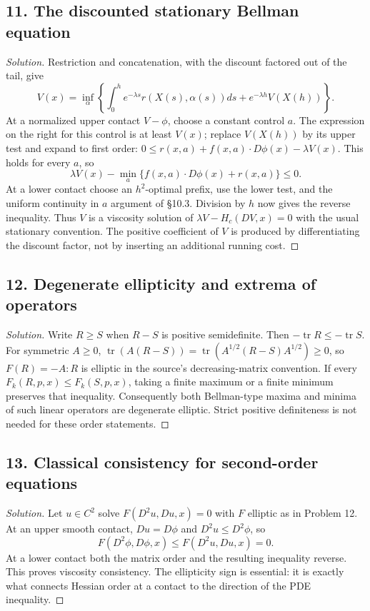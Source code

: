 \subsection*{11. The discounted stationary Bellman equation}
\begin{proof}[Solution]
Restriction and concatenation, with the discount factored out of the
tail, give
\[
 V(x)=\inf_\alpha\left\{\int_0^h e^{-\lambda s}r(X(s),\alpha(s))ds
                  +e^{-\lambda h}V(X(h))\right\}.
\]
At a normalized upper contact $V-\phi$, choose a constant control $a$.
The expression on the right for this control is at least $V(x)$;
replace $V(X(h))$ by its upper test and expand to first order:
$0\leq r(x,a)+f(x,a)\cdot D\phi(x)-\lambda V(x)$.
This holds for every $a$, so
\[
 \lambda V(x)-\min_a\{f(x,a)\cdot D\phi(x)+r(x,a)\}\leq0.
\]
At a lower contact choose an $h^2$-optimal prefix, use the lower test,
and the uniform continuity in $a$ argument of \S10.3. Division by $h$
now gives the reverse inequality. Thus $V$ is a viscosity solution of
$\lambda V-H_c(DV,x)=0$ with the usual stationary convention.
The positive coefficient of $V$ is produced by differentiating the
discount factor, not by inserting an additional running cost.
\end{proof}

\subsection*{12. Degenerate ellipticity and extrema of operators}
\begin{proof}[Solution]
Write $R\geq S$ when $R-S$ is positive semidefinite.
Then $-\operatorname{tr}R\leq-\operatorname{tr}S$.
For symmetric $A\geq0$,
$\operatorname{tr}(A(R-S))=\operatorname{tr}(A^{1/2}(R-S)A^{1/2})\geq0$,
so $F(R)=-A:R$ is elliptic in the source's decreasing-matrix convention.
If every $F_k(R,p,x)\leq F_k(S,p,x)$, taking a finite maximum or a
finite minimum preserves that inequality. Consequently both Bellman-type
maxima and minima of such linear operators are degenerate elliptic.
Strict positive definiteness is not needed for these order statements.
\end{proof}

\subsection*{13. Classical consistency for second-order equations}
\begin{proof}[Solution]
Let $u\in C^2$ solve $F(D^2u,Du,x)=0$ with $F$ elliptic as in
Problem 12. At an upper smooth contact, $Du=D\phi$ and
$D^2u\leq D^2\phi$, so
\[
 F(D^2\phi,D\phi,x)\leq F(D^2u,Du,x)=0.
\]
At a lower contact both the matrix order and the resulting inequality
reverse. This proves viscosity consistency. The ellipticity sign is
essential: it is exactly what connects Hessian order at a contact to
the direction of the PDE inequality.
\end{proof}

